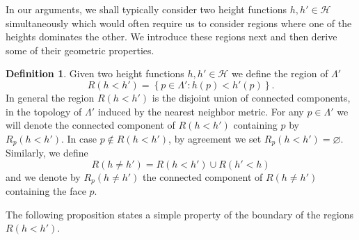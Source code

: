 \documentclass[reqno,11pt]{amsart}
\numberwithin{equation}{section}
\theoremstyle{definition}
\newtheorem{definition}[proposition]{Definition}
\begin{document}
In our arguments, we shall typically consider two height functions $h,h'\in \mathscr{H}$ simultaneously which would often require us to consider regions where one of the heights dominates the other. We introduce these regions next and then derive some of their geometric properties.
    
    \begin{definition}
    Given two height functions $h,h' \in \mathscr{H}$ we define the region of $\Lambda'$
    \begin{equation*}
        R(h<h') = \left\{ p \in \Lambda' : h(p) < h'(p) \right\}.
    \end{equation*}
    In general the region $R(h<h')$ is the disjoint union of connected components, in the topology of $\Lambda'$ induced by the nearest neighbor metric.   For any $p\in \Lambda'$ we will denote the connected component of $R(h<h')$ containing $p$ by $R_p(h<h')$. In case $p \notin R(h<h')$, by agreement we set $R_p(h<h')=\varnothing$. Similarly, we define 
    \begin{equation*}
        R(h\neq h') = R(h<h') \cup R(h'<h)
    \end{equation*} 
    and we denote by $R_p(h \neq h')$ the connected component of $R(h\neq h')$ containing the face $p$.
\end{definition}
The following proposition states a simple property of the boundary of the regions $R(h<h')$.
\end{document}
